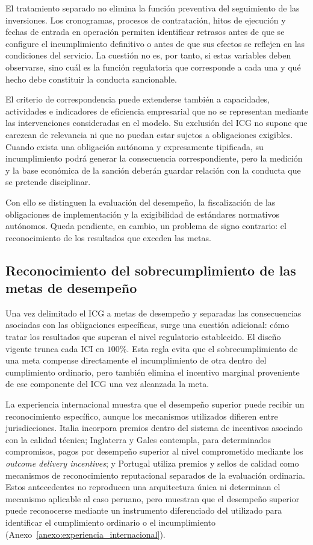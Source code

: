 El tratamiento separado no elimina la función preventiva del seguimiento de las inversiones. Los cronogramas, procesos de contratación, hitos de ejecución y fechas de entrada en operación permiten identificar retrasos antes de que se configure el incumplimiento definitivo o antes de que sus efectos se reflejen en las condiciones del servicio. La cuestión no es, por tanto, si estas variables deben observarse, sino cuál es la función regulatoria que corresponde a cada una y qué hecho debe constituir la conducta sancionable.

El criterio de correspondencia puede extenderse también a capacidades, actividades e indicadores de eficiencia empresarial que no se representan mediante las intervenciones consideradas en el modelo. Su exclusión del ICG no supone que carezcan de relevancia ni que no puedan estar sujetos a obligaciones exigibles. Cuando exista una obligación autónoma y expresamente tipificada, su incumplimiento podrá generar la consecuencia correspondiente, pero la medición y la base económica de la sanción deberán guardar relación con la conducta que se pretende disciplinar.

Con ello se distinguen la evaluación del desempeño, la fiscalización de las obligaciones de implementación y la exigibilidad de estándares normativos autónomos. Queda pendiente, en cambio, un problema de signo contrario: el reconocimiento de los resultados que exceden las metas.

\subsection{Reconocimiento del sobrecumplimiento de las metas de desempeño}

Una vez delimitado el ICG a metas de desempeño y separadas las consecuencias asociadas con las obligaciones específicas, surge una cuestión adicional: cómo tratar los resultados que superan el nivel regulatorio establecido. El diseño vigente trunca cada ICI en \(100\%\). Esta regla evita que el sobrecumplimiento de una meta compense directamente el incumplimiento de otra dentro del cumplimiento ordinario, pero también elimina el incentivo marginal proveniente de ese componente del ICG una vez alcanzada la meta.

La experiencia internacional muestra que el desempeño superior puede recibir un reconocimiento específico, aunque los mecanismos utilizados difieren entre jurisdicciones. Italia incorpora premios dentro del sistema de incentivos asociado con la calidad técnica; Inglaterra y Gales contempla, para determinados compromisos, pagos por desempeño superior al nivel comprometido mediante los \emph{outcome delivery incentives}; y Portugal utiliza premios y sellos de calidad como mecanismos de reconocimiento reputacional separados de la evaluación ordinaria. Estos antecedentes no reproducen una arquitectura única ni determinan el mecanismo aplicable al caso peruano, pero muestran que el desempeño superior puede reconocerse mediante un instrumento diferenciado del utilizado para identificar el cumplimiento ordinario o el incumplimiento (Anexo~\ref{anexo:experiencia_internacional}).

